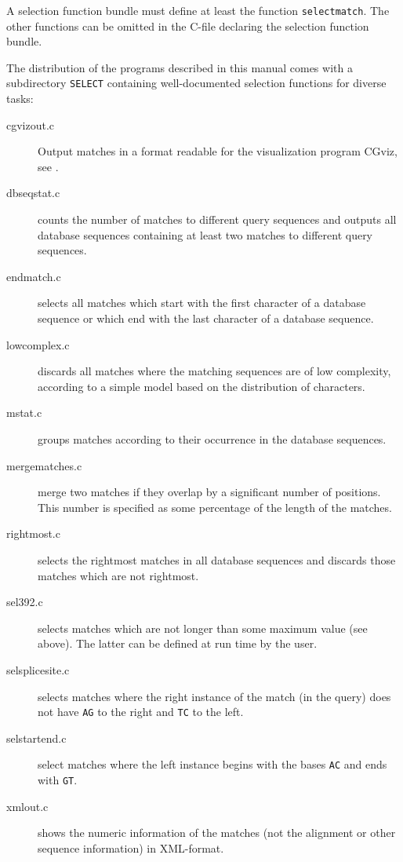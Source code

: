 \documentclass[12pt,titlepage]{article}
\begin{document}
A selection function bundle must define at least the function
\texttt{selectmatch}. The other functions
can be omitted in the C-file declaring the selection function bundle.

The distribution of the programs described in this manual comes with a 
subdirectory \texttt{SELECT} containing well-documented
selection functions for diverse tasks:

\begin{description}
\item[cgvizout.c]
Output matches in a format readable for the visualization program
CGviz, see \cite{DEL:DEZ:HUS:2003}.
\label{CGvizselfun}
\item[dbseqstat.c]
counts the number of matches to different query sequences and outputs
all database sequences containing at least two matches to different
query sequences.
\item[endmatch.c]
selects all matches which start with the first
character of a database sequence or which end with the last character
of a database sequence.
\item[lowcomplex.c]
discards all matches where the matching sequences are of low complexity,
according to a simple model based on the distribution of characters.
\item[mstat.c]
groups matches according to their occurrence in the database sequences.
\item[mergematches.c]
merge two matches if they overlap by a significant number of positions.
This number is specified as some percentage of the length of the matches.
\label{Mergematchesselfun}
\item[rightmost.c]
selects the rightmost matches in all database sequences and discards
those matches which are not rightmost.
\item[sel392.c]
selects matches which are not longer than some maximum value (see
above). The latter can be defined at run time by the user.
\item[selsplicesite.c]
selects matches where the right instance of the match (in the query) does not
have \texttt{AG} to the right and \texttt{TC} to the left.
\item[selstartend.c]
select matches where the left instance begins with the bases \texttt{AC} and
ends with \texttt{GT}.
\item[xmlout.c]
shows the numeric information of the matches (not the alignment or
other sequence information) in XML-format.
\end{description}
\end{document}
